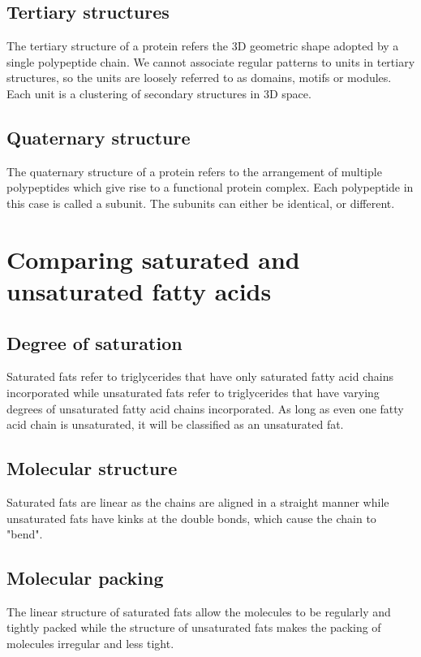 \documentclass[11pt]{article}
\begin{document}
\subsection{Tertiary structures}
\label{sec:org20f6ad0}
The tertiary structure of a protein refers the 3D geometric shape adopted by a single polypeptide chain. We cannot associate regular patterns to units in tertiary structures, so the units are loosely referred to as domains, motifs or modules. Each unit is a clustering of secondary structures in 3D space.
\subsection{Quaternary structure}
\label{sec:org9b2d56c}
The quaternary structure of a protein refers to the arrangement of multiple polypeptides which give rise to a functional protein complex. Each polypeptide in this case is called a subunit. The subunits can either be identical, or different.

\newpage
\section{Comparing saturated and unsaturated fatty acids}
\label{sec:orgd1c523e}

\subsection{Degree of saturation}
\label{sec:org5fd714b}
Saturated fats refer to triglycerides that have only saturated fatty acid chains incorporated while unsaturated fats refer to triglycerides that have varying degrees of unsaturated fatty acid chains incorporated. As long as even one fatty acid chain is unsaturated, it will be classified as an unsaturated fat.
\subsection{Molecular structure}
\label{sec:org9045f85}
Saturated fats are linear as the chains are aligned in a straight manner while unsaturated fats have kinks at the double bonds, which cause the chain to "bend".
\subsection{Molecular packing}
\label{sec:org2848fd3}
The linear structure of saturated fats allow the molecules to be regularly and tightly packed while the structure of unsaturated fats makes the packing of molecules irregular and less tight.
\end{document}
